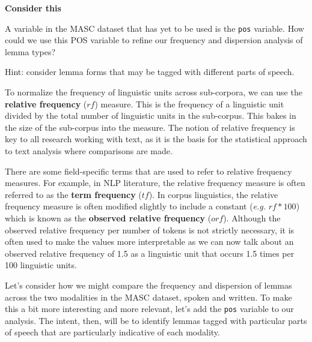 \documentclass[
  letterpaper,
  krantz1]{latex/krantz-mod}
\theoremstyle{definition}
\theoremstyle{definition}
\theoremstyle{remark}
\begin{document}
\begin{tcolorbox}[enhanced jigsaw, toprule=.15mm, breakable, colback=white, arc=.35mm, left=2mm, colframe=quarto-callout-color-frame, opacityback=0, bottomrule=.15mm, rightrule=.15mm, leftrule=.75mm]

\textbf{ Consider this}

A variable in the MASC dataset that has yet to be used is the
\texttt{pos} variable. How could we use this POS variable to refine our
frequency and dispersion analysis of lemma types?

Hint: consider lemma forms that may be tagged with different parts of
speech.

\end{tcolorbox}

To normalize the frequency of linguistic units across sub-corpora, we
can use the \textbf{relative frequency}
(\(rf\)) measure. This is the frequency of a linguistic unit divided by
the total number of linguistic units in the sub-corpus. This bakes in
the size of the sub-corpus into the measure. The notion of relative
frequency is key to all research working with text, as it is the basis
for the statistical approach to text analysis where comparisons are
made.

There are some field-specific terms that are used to refer to relative
frequency measures. For example, in
NLP literature, the relative
frequency measure is often referred to as the \textbf{term
frequency} (\(tf\)). In corpus linguistics, the
relative frequency measure is often modified slightly to include a
constant (\emph{e.g.} \(rf * 100\)) which is known as the
\textbf{observed relative frequency}
(\(orf\)). Although the observed relative frequency per number of tokens
is not strictly necessary, it is often used to make the values more
interpretable as we can now talk about an observed relative frequency of
1.5 as a linguistic unit that occurs 1.5 times per 100 linguistic units.

Let's consider how we might compare the
frequency and
dispersion of lemmas across the
two modalities in the MASC dataset, spoken and written. To make this a
bit more interesting and more relevant, let's add the \texttt{pos}
variable to our analysis. The intent, then, will be to identify lemmas
tagged with particular parts of speech that are particularly indicative
of each modality.
\end{document}
